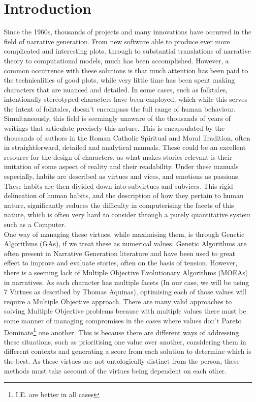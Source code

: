 \documentclass[11pt]{article}
\begin{document}
\section{Introduction}
Since the 1960s, thousands of projects and many innovations have occurred in the field of narrative generation. From new software able to produce ever more complicated and interesting plots, through to substantial translations of narrative theory to computational models, much has been accomplished. However, a common occurrence with these solutions is that much attention has been paid to the technicalities of good plots, while very little time has been spent making characters that are nuanced and detailed. In some cases, such as folktales, intentionally stereotyped characters have been employed, which while this serves the intent of folktales, doesn't encompass the full range of human behaviour. Simultaneously, this field is seemingly unaware of the thousands of years of writings that articulate precisely this nature. This is encapsulated by the thousands of authors in the Roman Catholic Spiritual and Moral Tradition, often in straightforward, detailed and analytical manuals. These could be an excellent resource for the design of characters, as what makes stories relevant is their imitation of some aspect of reality and their readability. Under these manuals especially, habits are described as virtues and vices, and emotions as passions. These habits are then divided down into subvirtues and subvices. This rigid delineation of human habits, and the description of how they pertain to human nature, significantly reduces the difficulty in computerising the facets of this nature, which is often very hard to consider through a purely quantitative system such as a Computer.\\
One way of managing these virtues, while maximising them, is through Genetic Algorithms (GAs), if we treat these as numerical values. Genetic Algorithms are often present in Narrative Generation literature and have been used to great effect to improve and evaluate stories, often on the basis of tension. However, there is a seeming lack of Multiple Objective Evolutionary Algorithms (MOEAs) in narratives. As each character has multiple facets (In our case, we will be using 7 Virtues as described by Thomas Aquinas), optimising each of those values will require a Multiple Objective approach. There are many valid approaches to solving Multiple Objective problems because with multiple values there must be some manner of managing compromises in the cases where values don't Pareto Dominate\footnote{I.E. are better in all cases} one another. This is because there are different ways of addressing these situations, such as prioritising one value over another, considering them in different contexts and generating a score from each solution to determine which is the best. As these virtues are not ontologically distinct from the person, these methods must take account of the virtues being dependent on each other.\\
\end{document}
